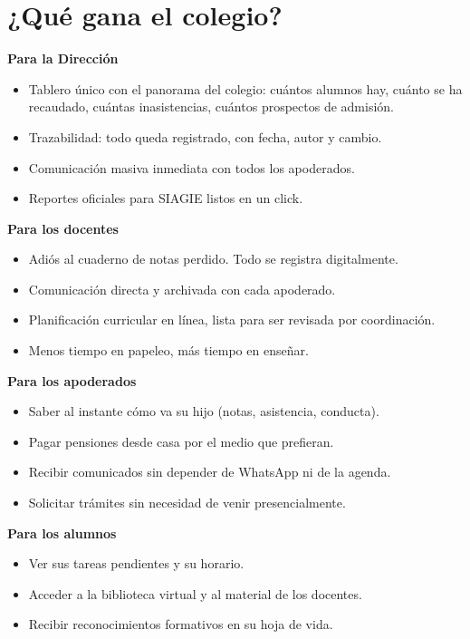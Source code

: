 \documentclass[11pt,a4paper]{article}
\begin{document}
\section{¿Qué gana el colegio?}

\begin{successbox}
\textbf{Para la Dirección}
\begin{itemize}
\item Tablero único con el panorama del colegio: cuántos alumnos hay, cuánto se ha recaudado, cuántas inasistencias, cuántos prospectos de admisión.
\item Trazabilidad: todo queda registrado, con fecha, autor y cambio.
\item Comunicación masiva inmediata con todos los apoderados.
\item Reportes oficiales para SIAGIE listos en un click.
\end{itemize}
\end{successbox}

\begin{successbox}
\textbf{Para los docentes}
\begin{itemize}
\item Adiós al cuaderno de notas perdido. Todo se registra digitalmente.
\item Comunicación directa y archivada con cada apoderado.
\item Planificación curricular en línea, lista para ser revisada por coordinación.
\item Menos tiempo en papeleo, más tiempo en enseñar.
\end{itemize}
\end{successbox}

\begin{successbox}
\textbf{Para los apoderados}
\begin{itemize}
\item Saber al instante cómo va su hijo (notas, asistencia, conducta).
\item Pagar pensiones desde casa por el medio que prefieran.
\item Recibir comunicados sin depender de WhatsApp ni de la agenda.
\item Solicitar trámites sin necesidad de venir presencialmente.
\end{itemize}
\end{successbox}

\begin{successbox}
\textbf{Para los alumnos}
\begin{itemize}
\item Ver sus tareas pendientes y su horario.
\item Acceder a la biblioteca virtual y al material de los docentes.
\item Recibir reconocimientos formativos en su hoja de vida.
\end{itemize}
\end{successbox}
\end{document}

